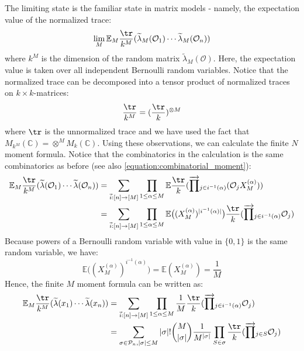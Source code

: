 \documentclass[a4paper,11pt]{article}
\theoremstyle{definition}
\numberwithin{equation}{section}
\begin{document}
The limiting state is the familiar state in matrix models - namely, the expectation value of the normalized trace:
\begin{equation}
    \lim_M \mathbb{E}_M\frac{\tr}{k^M}(\widetilde{\lambda}_M(\mathcal{O}_1)\cdots\widetilde{\lambda}_M(\mathcal{O}_n))
\end{equation}
where $k^M$ is the dimension of the random matrix $\widetilde{\lambda}_M(\mathcal{O})$. Here, the expectation value is taken over all independent Bernoulli random variables. Notice that the normalized trace can be decomposed into a tensor product of normalized traces on $k\times k$-matrices:
\begin{equation}
    \frac{\tr}{k^M} = (\frac{\tr}{k})^{\otimes M}
\end{equation}
where $\tr$ is the unnormalized trace and we have used the fact that $M_{k^M}(\mathbb{C}) = \otimes^M M_k(\mathbb{C})$. Using these observations, we can calculate the finite $N$ moment formula. Notice that the combinatorics in the calculation is the same combinatorics as before (see also \ref{equation:combinatorial_moment}):
\begin{align}
    \begin{split}
        \mathbb{E}_M\frac{\tr}{k^M}(\widetilde{\lambda}(\mathcal{O}_1)\cdots\widetilde{\lambda}(\mathcal{O}_n)) &= \sum_{\vec{i}:[n]\rightarrow[M]}\prod_{1\leq \alpha\leq M}\mathbb{E}\frac{\tr}{k}(\overrightarrow{\prod}_{j\in i^{-1}(\alpha)}(\mathcal{O}_jX_M^{(\alpha)}))
        \\
        &=\sum_{\vec{i}:[n]\rightarrow[M]}\prod_{1\leq \alpha\leq M}\mathbb{E}\big((X_M^{(\alpha)})^{|i^{-1}(\alpha)|}\big)\frac{\tr}{k}(\overrightarrow{\prod}_{j\in i^{-1}(\alpha)}\mathcal{O}_j)
    \end{split}
\end{align}
Because powers of a Bernoulli random variable with value in $\{0,1\}$ is the same random variable, we have:
\begin{equation}
    \mathbb{E}\big((X_M^{(\alpha)})^{i^{-1}(\alpha)}\big) = \mathbb{E}(X_M^{(\alpha)}) = \frac{1}{M}
\end{equation}
Hence, the finite $M$ moment formula can be written as:
\begin{align}
    \begin{split}
        \mathbb{E}_M\frac{\tr}{k^M}(\widetilde{\lambda}(x_1)\cdots\widetilde{\lambda}(x_n)) &= \sum_{\vec{i}:[n]\rightarrow[M]}\prod_{1\leq\alpha\leq M}\frac{1}{M}\frac{\tr}{k}(\overrightarrow{\prod}_{j\in i^{-1}(\alpha)}\mathcal{O}_j)
        \\&=\sum_{\sigma\in\mathcal{P}_n, |\sigma|\leq M}|\sigma|!\binom{M}{|\sigma|}\frac{1}{M^{|\sigma|}}\prod_{S\in \sigma}\frac{\tr}{k}(\overrightarrow{\prod}_{j\in S}\mathcal{O}_j)
    \end{split}
\end{align}
\end{document}
